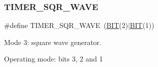 \subsubsection{\texorpdfstring{T\+I\+M\+E\+R\+\_\+\+S\+Q\+R\+\_\+\+W\+A\+VE}{TIMER\_SQR\_WAVE}}
{\footnotesize\ttfamily \#define T\+I\+M\+E\+R\+\_\+\+S\+Q\+R\+\_\+\+W\+A\+VE~(\hyperlink{group___serial_ga3a8ea58898cb58fc96013383d39f482c}{B\+IT}(2)$\vert$\hyperlink{group___serial_ga3a8ea58898cb58fc96013383d39f482c}{B\+IT}(1))}



Mode 3\+: square wave generator. 

Operating mode\+: bits 3, 2 and 1 